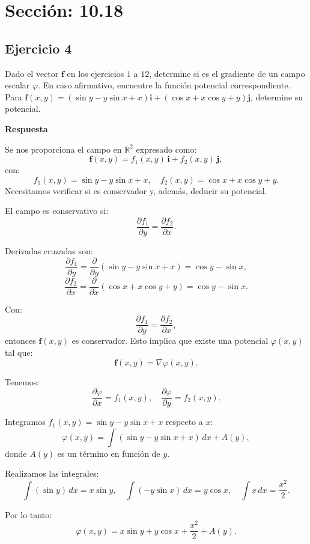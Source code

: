 \documentclass{report}
\begin{document}
\section*{\textcolor{color1018}{Sección: 10.18}}
\subsection*{Ejercicio 4}
Dado el vector $\boldsymbol{f}$ en los ejercicios $1$ a $12$, determine si es el gradiente de un campo escalar $\varphi$. En caso afirmativo, encuentre la función potencial correspondiente. Para $\boldsymbol{f}(x, y)=(\sin y-y \sin x+x)\mathbf{i}+(\cos x+x \cos y+y)\mathbf{j}$, determine su potencial.

\textbf{Respuesta}

Se nos proporciona el campo en $\mathbb{R}^2$ expresado como:
\[
\boldsymbol{f}(x, y) = f_1(x, y) \, \mathbf{i} + f_2(x, y) \, \mathbf{j},
\]
con:
\[
f_1(x, y) = \sin y - y \sin x + x, \quad f_2(x, y) = \cos x + x \cos y + y.
\]
Necesitamos verificar si es conservador y, además, deducir su potencial.



El campo es conservativo si:
\[
\frac{\partial f_1}{\partial y} = \frac{\partial f_2}{\partial x}.
\]

Derivadas cruzadas son:
\[
\frac{\partial f_1}{\partial y} = \frac{\partial}{\partial y} (\sin y - y \sin x + x) = \cos y - \sin x,
\]
\[
\frac{\partial f_2}{\partial x} = \frac{\partial}{\partial x} (\cos x + x \cos y + y) = \cos y - \sin x.
\]

Con:
\[
\frac{\partial f_1}{\partial y} = \frac{\partial f_2}{\partial x},
\]
entonces $\mathbf{f}(x, y)$ es conservador. Esto implica que existe una potencial $\varphi(x, y)$ tal que:
\[
\mathbf{f}(x, y) = \nabla \varphi(x, y).
\]



Tenemos:
\[
\frac{\partial \varphi}{\partial x} = f_1(x, y), \quad \frac{\partial \varphi}{\partial y} = f_2(x, y).
\]



Integramos $f_1(x, y) = \sin y - y \sin x + x$ respecto a \( x \):
\[
\varphi(x, y) = \int (\sin y - y \sin x + x) \, dx + A(y),
\]
donde \( A(y) \) es un término en función de \( y \).

Realizamos las integrales:
\[
\int (\sin y) \, dx = x \sin y, \quad \int (-y \sin x) \, dx = y \cos x, \quad \int x \, dx = \frac{x^2}{2}.
\]

Por lo tanto:
\[
\varphi(x, y) = x \sin y + y \cos x + \frac{x^2}{2} + A(y).
\]
\end{document}
